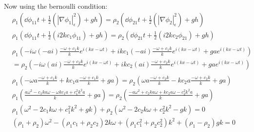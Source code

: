 \documentclass{/home/janmebows/Documents/LatexTemplates/myassignment}
\begin{document}
\begin{enumerate}
\begin{enumerate}
        Now using the bernoulli condition:
        \begin{align*}
            &\rho_1\left(\dd{\phi_{11}}t + \frac12\left(|\nabla\phi_1|^2_{\epsilon} \right) + gh\right) =\rho_2\left(\dd{\phi_{21}}t + \frac12\left(|\nabla\phi_2|^2_{\epsilon}\right) + gh\right)\\  
            &\rho_1\left(\dd{\phi_{11}}t + \frac12\left(i2kc_1 \phi_{11} \right) + gh\right) =\rho_2\left(\dd{\phi_{21}}t + \frac12\left(i2kc_2 \phi_{21}\right) + gh\right)\\\\  
            &\rho_1\left(-i\omega(-ai)\frac{-\omega  + c_{1} k}{k} e^{i(kx-\omega t)} + ikc_1(-ai)\frac{-\omega  + c_{1} k}{k} e^{i(kx-\omega t)} + gae^{i(kx-\omega t)}\right) \\
            &=\rho_2\left(-i\omega(ai)\frac{-\omega  + c_{2} k}{k}e^{i(kx-\omega t)} + ikc_2 (ai)\frac{-\omega  + c_{2} k}{k}e^{i(kx-\omega t)} + gae^{i(kx-\omega t)}\right)\\\\   
            &\rho_1\left(-\omega a\frac{-\omega  + c_{1} k}{k} + kc_1a\frac{-\omega  + c_{1} k}{k}  + ga\right) =\rho_2\left(\omega a\frac{-\omega  + c_{2} k}{k}- kc_2a\frac{-\omega  + c_{2} k}{k}+ ga\right)\\  
            &\rho_1\left(\frac{a\omega^2  - c_{1} k a \omega-\omega kc_1a  + c_{1}^2k^2 a }{k}  + ga\right) =\rho_2\left(\frac{-a\omega^2   + c_{2} ka\omega +kc_2a\omega  - c_{2}^2 k^2a}{k}+ ga\right)\\  
            &\rho_1\left(\omega^2  - 2c_{1} k \omega  + c_{1}^2k^2 + gk\right) + \rho_2\left(\omega^2 - 2c_{2} k\omega + c_{2}^2 k^2- gk\right)=0\\
            & (\rho_1+\rho_2)\omega^2  - (\rho_1c_1+\rho_2c_2)2 k  \omega  + (\rho_1c_{1}^2+\rho_2c_2^2)k^2 + (\rho_1-\rho_2)gk=0\\
        \end{align*}


\end{enumerate}
\end{enumerate}
\end{document}
